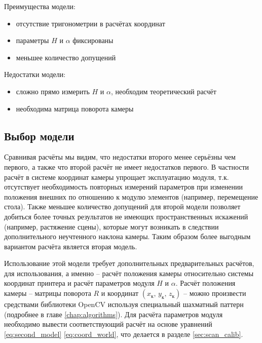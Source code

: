             Преимущества модели:
            \begin{itemize}
                \item отсутствие тригонометрии в расчётах координат
                \item параметры $ H $ и $ \alpha $ фиксированы
                \item меньшее количество допущений
            \end{itemize}
            
            Недостатки модели:
            \begin{itemize}
                \item сложно прямо измерить $ H $ и $ \alpha $, необходим теоретический расчёт
                \item необходима матрица поворота камеры
            \end{itemize}
            
        \subsection{Выбор модели}
            Сравнивая расчёты мы видим, что недостатки второго менее серьёзны чем первого, а также что второй расчёт не имеет недостатков первого. В частности расчёт в системе координат камеры упрощает эксплуатацию модуля, т.к. отсутствует необходимость повторных измерений параметров при изменении положения внешних по отношению к модулю элементов (например, перемещение стола). Также меньшее количество допущений для второй модели позволяет добиться более точных результатов не имеющих пространственных искажений (например, растяжение сцены), которые могут возникать в следствии дополнительного неучтенного наклона камеры.
            Таким образом более выгодным вариантом расчёта является вторая модель.
            
            \sloppy Использование этой модели требует дополнительных предварительных расчётов, для использования, а именно -- расчёт положения камеры относительно системы координат принтера и расчёт параметров модуля $ H $ и $\alpha$. Расчёт положения камеры -- матрицы поворота $ R $ и координат $ \left(x_\text{к},\,y_\text{к},\,z_\text{к}\right) $ -- можно произвести средствами библиотеки OpenCV используя специальный шахматный паттерн (подробнее в главе \ref{chap:algorithms}). Для расчёта параметров модуля необходимо вывести соответствующий расчёт на основе уравнений \ref{eq:second_model} \ref{eq:coord_world}, что делается в разделе \ref{sec:scan_calib}.

